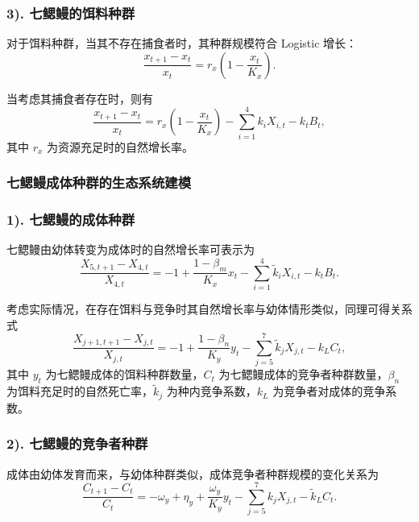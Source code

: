 \documentclass[11pt,a4paper]{ctexart}
\begin{document}
\subsubsection*{3). 七鳃鳗的饵料种群}

对于饵料种群，当其不存在捕食者时，其种群规模符合 Logistic 增长：
\begin{equation}
\frac{x_{t+1}-x_t}{x_t}=r_x\left(1-\frac{x_t}{K_x}\right).
\end{equation}

当考虑其捕食者存在时，则有
\begin{equation}
\frac{x_{t+1}-x_t}{x_t}=r_x\left(1-\frac{x_t}{K_x}\right)-\sum_{i=1}^{4}k_iX_{i,t}-k_tB_t,
\end{equation}
其中 $r_x$ 为资源充足时的自然增长率。

\subsubsection{七鳃鳗成体种群的生态系统建模}

\subsubsection*{1). 七鳃鳗的成体种群}

七鳃鳗由幼体转变为成体时的自然增长率可表示为
\begin{equation}
\frac{X_{5,t+1}-X_{4,t}}{X_{4,t}}=-1+\frac{1-\beta_m}{K_x}x_t-\sum_{i=1}^{4}\tilde{k}_iX_{i,t}-k_tB_t.
\end{equation}

考虑实际情况，在存在饵料与竞争时其自然增长率与幼体情形类似，同理可得关系式
\begin{equation}
\frac{X_{j+1,t+1}-X_{j,t}}{X_{j,t}}=-1+\frac{1-\beta_n}{K_y}y_t-\sum_{j=5}^{7}\tilde{k}_jX_{j,t}-k_LC_t,
\end{equation}
其中 $y_t$ 为七鳃鳗成体的饵料种群数量，$C_t$ 为七鳃鳗成体的竞争者种群数量，$\beta_n$ 为饵料充足时的自然死亡率，$\tilde{k}_j$ 为种内竞争系数，$k_L$ 为竞争者对成体的竞争系数。

\subsubsection*{2). 七鳃鳗的竞争者种群}

成体由幼体发育而来，与幼体种群类似，成体竞争者种群规模的变化关系为
\begin{equation}
\frac{C_{t+1}-C_t}{C_t}=-\omega_y+\eta_y+\frac{\omega_y}{K_y}y_t-\sum_{j=5}^{7}k_jX_{j,t}-\tilde{k}_LC_t.
\end{equation}
\end{document}
